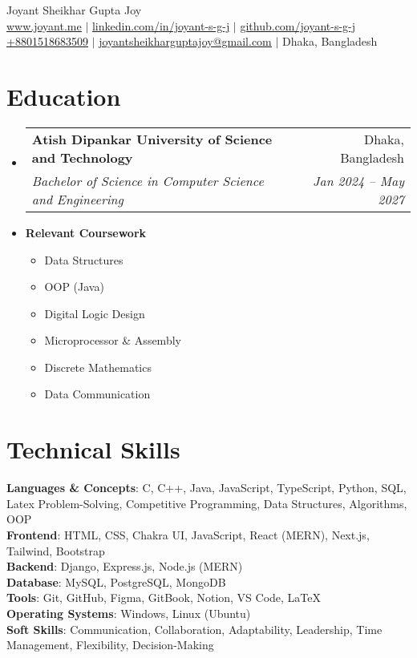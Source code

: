 \documentclass[a4paper,11pt]{article}
\makeatletter
\newcommand{\resumeSubheading}[4]{
  \vspace{-2pt}\item
    \begin{tabular*}{0.97\textwidth}[t]{l@{\extracolsep{\fill}}r}
      \textbf{#1} & #2 \\
      \textit{\small#3} & \textit{\small #4} \\
    \end{tabular*}\vspace{-7pt}
}
\newcommand{\resumeCourseheadeading}[1]{
  \vspace{-2pt}\item
    \textbf{#1}\vspace{-7pt} \\
}
\newcommand{\resumeCoursework}[1]{
  \vspace{2pt}
  \begin{multicols}{3}
    \begin{itemize}[leftmargin=*, label=\textbullet, itemsep=2pt]
      #1
    \end{itemize}
  \end{multicols}
}
\newcommand{\resumeSubHeadingListStart}{\begin{itemize}[leftmargin=0.15in, label={}]}
\newcommand{\resumeSubHeadingListEnd}{\end{itemize}}
\makeatother
\begin{document}
\begin{center}
    {\Huge \rmfamily Joyant Sheikhar Gupta Joy} \\ \vspace{1pt}
    \href{https://joyant.me/}{\underline{www.joyant.me}} $|$
    \href{https://www.linkedin.com/in/joyant-s-g-j/}{\underline{linkedin.com/in/joyant-s-g-j}} $|$
    \href{https://github.com/joyant-s-g-j}{\underline{github.com/joyant-s-g-j}} \\
    \small \href{tel:+8801518683509}{\underline{+8801518683509}} $|$ 
    \href{mailto:joyantsheikharguptajoy@gmail.com}{\underline{joyantsheikharguptajoy@gmail.com}} $|$ 
    \small{Dhaka, Bangladesh}
\end{center}


\section{Education}
  \resumeSubHeadingListStart
    \resumeSubheading
      {Atish Dipankar University of Science and Technology}{Dhaka, Bangladesh}
      {Bachelor of Science in Computer Science and Engineering }{Jan 2024 -- May 2027}
    \resumeCourseheadeading
      {Relevant Coursework}
    \resumeCoursework{
      \item Data Structures
      \item OOP (Java)
      \item Digital Logic Design
      \item Microprocessor \& Assembly
      \item Discrete Mathematics
      \item Data Communication
    }
  \resumeSubHeadingListEnd

\section{Technical Skills}
 \begin{itemize}[leftmargin=0.15in, label={}]
    \small{\item{
     \textbf{Languages \& Concepts}{: C, C++, Java, JavaScript, TypeScript, Python, SQL, Latex Problem-Solving, Competitive Programming, Data Structures, Algorithms, OOP} \\
     \textbf{Frontend}{: HTML, CSS, Chakra UI, JavaScript, React (MERN), Next.js, Tailwind, Bootstrap} \\
     \textbf{Backend}{: Django, Express.js, Node.js (MERN)} \\
     \textbf{Database}{: MySQL, PostgreSQL, MongoDB} \\
     \textbf{Tools}{: Git, GitHub, Figma, GitBook, Notion, VS Code, LaTeX} \\
     \textbf{Operating Systems}{: Windows, Linux (Ubuntu)} \\
     \textbf{Soft Skills}{: Communication, Collaboration, Adaptability, Leadership, Time Management, Flexibility, Decision-Making}
    }}
 \end{itemize}
\end{document}
